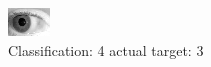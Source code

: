 \begin{figure}[h!]
\begin{center}
\includegraphics[width=0.60\columnwidth]{figures/ID303_class_4_target_3.png}
\end{center}
\caption{ Classification: 4 actual target: 3}
\label{fig:ID303_class_4_target_3}
\end{figure}
